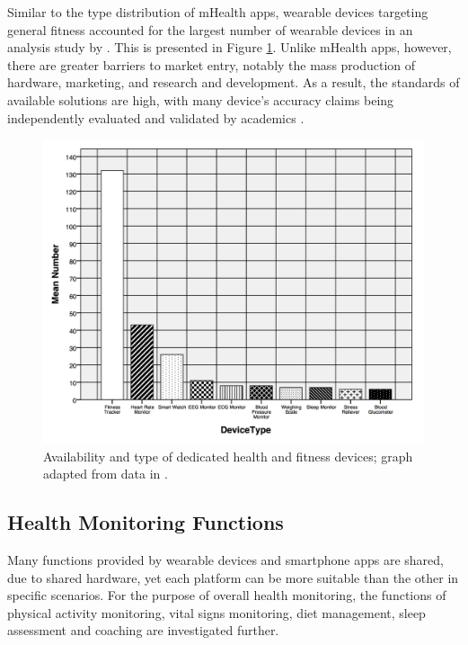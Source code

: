 Similar to the type distribution of mHealth apps, wearable devices targeting general fitness accounted for the largest number of wearable devices in an analysis study by \cite{IMSmHealth2015}. This is presented in Figure \ref{fig: imshealth-devices}. Unlike mHealth apps, however, there are greater barriers to market entry, notably the mass production of hardware, marketing, and research and development. As a result, the standards of available solutions are high, with many device's accuracy claims being independently evaluated and validated by academics \cite{Ferguson2015}.

\begin{figure}[h]
    \centering
    \includegraphics[scale=0.35, angle=0]{Files/literature-review/figures/imshealth-devices}
    \caption{Availability and type of dedicated health and fitness devices; graph adapted from data in \cite{IMSmHealth2015}.}
    \label{fig: imshealth-devices}
\end{figure}

\subsection{Health Monitoring Functions}
Many functions provided by wearable devices and smartphone apps are shared, due to shared hardware, yet each platform can be more suitable than the other in specific scenarios. For the purpose of overall health monitoring, the functions of physical activity monitoring, vital signs monitoring, diet management, sleep assessment and coaching are investigated further.

